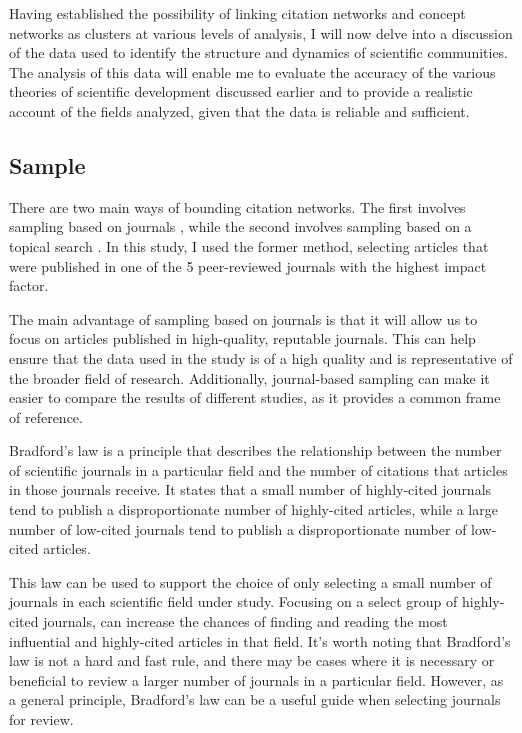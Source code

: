 Having established the possibility of linking citation networks and concept networks as clusters at various levels of analysis, I will now delve into a discussion of the data used to identify the structure and dynamics of scientific communities. The analysis of this data will enable me to evaluate the accuracy of the various theories of scientific development discussed earlier and to provide a realistic account of the fields analyzed, given that the data is reliable and sufficient.

\subsection{Sample}

There are two main ways of bounding citation networks. The first involves sampling based on journals
 \citep{beam2014, moody2006}, while the second involves sampling based on a topical 
 search \citep{borrett2014,callon2005,chavalarias2013}. In this study, I used 
 the former method, selecting articles that were published in one of the 5 peer-reviewed journals 
 with the highest impact factor.

The main advantage of sampling based on journals is that it will allow us to focus on articles 
published in high-quality, reputable journals. This can help ensure that the data used in the study 
is of a high quality and is representative of the broader field of research. Additionally, 
journal-based sampling can make it easier to compare the results of different studies, as it 
provides a common frame of reference.

Bradford's law is a principle that describes the relationship between the number of scientific 
journals in a particular field and the number of citations that articles in those journals receive. 
It states that a small number of highly-cited journals tend to publish a disproportionate number of 
highly-cited articles, while a large number of low-cited journals tend to publish a disproportionate 
number of low-cited articles.

This law can be used to support the choice of only selecting a small number of journals in each 
scientific field under study. Focusing on a select group of highly-cited journals, can increase the 
chances of finding and reading the most influential and highly-cited articles in that field. It's 
worth noting that Bradford's law is not a hard and fast rule, and there may be cases where it is 
necessary or beneficial to review a larger number of journals in a particular field. However, as a 
general principle, Bradford's law can be a useful guide when selecting journals for review.

